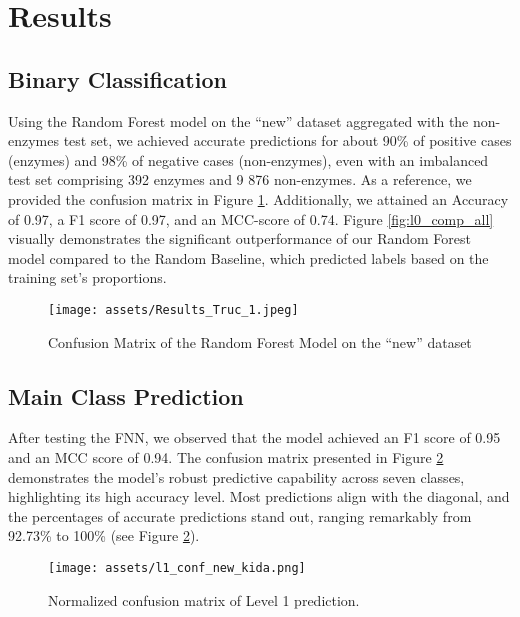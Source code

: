 \documentclass{bioinfo}
\begin{document}
\section{Results}	

\subsection{Binary Classification}\label{sec:RF_level0}
Using the Random Forest model on the ``new'' dataset aggregated with the non-enzymes test set, we achieved accurate
predictions for about 90\% of positive cases (enzymes) and 98\% of negative
cases (non-enzymes), even with an imbalanced test set comprising 392
enzymes and 9 876 non-enzymes. As a reference, we provided the confusion
matrix in Figure \ref{fig:RF_conf_l0}.
Additionally, we attained an Accuracy of 0.97, a F1 score of
0.97, and an MCC-score of 0.74. Figure \ref{fig:l0_comp_all} visually demonstrates the significant outperformance of our Random Forest model 
compared to the Random Baseline, which predicted labels based on the training set's proportions.

\begin{figure}[!hb]
\texttt{[image: assets/Results\_Truc\_1.jpeg]}
\caption{Confusion Matrix of the Random Forest Model on the “new” dataset}\label{fig:RF_conf_l0}
\end{figure}


\subsection{Main Class Prediction}
After testing the FNN, we observed that the model achieved an F1 score of 0.95 and an MCC score of 0.94. 
The confusion matrix presented in Figure \ref{fig:FNN_conf_l1} demonstrates the model's robust predictive capability across seven classes, 
highlighting its high accuracy level. Most predictions align with the diagonal, and the percentages of accurate predictions stand out, 
ranging remarkably from 92.73\% to 100\% (see Figure \ref{fig:FNN_conf_l1}).

\begin{figure}[!t]
\texttt{[image: assets/l1\_conf\_new\_kida.png]}
\caption{Normalized confusion matrix of Level 1 prediction.}\label{fig:FNN_conf_l1}
\end{figure}
\end{document}
